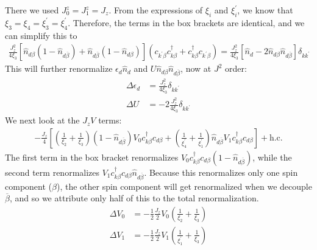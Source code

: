 \documentclass[twoside]{report}
\numberwithin{equation}{section}
\begin{document}
There we used \(J_0^z = J_1^z = J_z\). From the expressions of \(\xi_i\) and \(\xi_i^\prime\), we know that \(\xi_3 = \xi_4 = \xi_3^\prime = \xi_4^\prime\). Therefore, the terms in the box brackets are identical, and we can simplify this to
\begin{equation}\begin{aligned}
	\frac{J_z^2}{4\xi_3}\left[\hat n_{d\beta}\left( 1 - \hat n_{d\overline\beta} \right) + \hat n_{d\overline\beta}\left( 1 - \hat n_{d\beta} \right) \right]\left(c_{k^\prime\beta}c^\dagger_{k\beta} + c^\dagger_{k\beta}c_{k^\prime\beta}\right) = \frac{J_z^2}{4\xi_3}\left[\hat n_{d} - 2\hat n_{d\beta}\hat n_{d\overline\beta} \right]\delta_{kk^\prime}
\end{aligned}\end{equation}
This will further renormalize \(\epsilon_d \hat n_d\) and \(U\hat n_{d\beta}\hat n_{d\overline\beta}\), now at \(J^2\) order:
\begin{equation}\begin{aligned}
	\label{edU2}
	\Delta \epsilon_d &= \frac{J_z^2}{4\xi_3}\delta_{kk^\prime}\\
	\Delta U &= -2\frac{J_z^2}{4\xi_3}\delta_{kk^\prime}
\end{aligned}\end{equation}
We next look at the \(J_z V\) terms:
\begin{equation}\begin{aligned}
	-\frac{J_z}{4}\left[\left(\frac{1}{\xi_2} + \frac{1}{\xi_3}\right)\left(1 - \hat n_{d\overline\beta}\right)V_0 c^\dagger_{k\beta}c_{d\beta} + \left(\frac{1}{\xi^\prime_4} + \frac{1}{\xi^\prime_1}\right)\hat n_{d\overline\beta} V_1 c^\dagger_{k\beta}c_{d\beta}\right] + \text{h.c.}
\end{aligned}\end{equation}
The first term in the box bracket renormalizes \(V_0 c^\dagger_{k\beta}c_{d\beta}\left(1 - \hat n_{d\overline\beta}\right)\), while the second term renormalizes \(V_1 c^\dagger_{k\beta}c_{d\beta}\hat n_{d\overline\beta}\). Because this renormalizes only one spin component (\(\beta\)), the other spin component will get renormalized when we decouple \(\overline\beta\), and so we attribute only half of this to the total renormalization.
\begin{equation}\begin{aligned}
	\Delta V_0 &= -\frac{1}{2}\frac{J_z}{2}V_0\left(\frac{1}{\xi_2} + \frac{1}{\xi_3}\right)\\
	\Delta V_1 &= -\frac{1}{2}\frac{J_z}{2}V_1\left(\frac{1}{\xi^\prime_1} + \frac{1}{\xi_3}\right)
\end{aligned}\end{equation}
\end{document}
